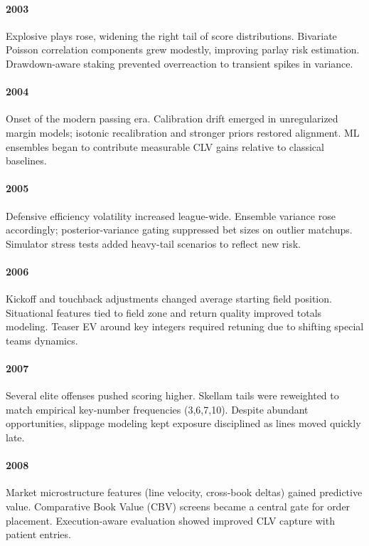 \documentclass[12pt]{report}  %
\numberwithin{equation}{section}
\theoremstyle{plain}
\theoremstyle{definition}
\theoremstyle{remark}
\begin{document}
\paragraph{2003} Explosive plays rose, widening the right tail of score distributions. Bivariate Poisson correlation components grew modestly, improving parlay risk estimation. Drawdown-aware staking prevented overreaction to transient spikes in variance.

\paragraph{2004} Onset of the modern passing era. Calibration drift emerged in unregularized margin models; isotonic recalibration and stronger priors restored alignment. ML ensembles began to contribute measurable CLV gains relative to classical baselines.

\paragraph{2005} Defensive efficiency volatility increased league-wide. Ensemble variance rose accordingly; posterior-variance gating suppressed bet sizes on outlier matchups. Simulator stress tests added heavy-tail scenarios to reflect new risk.

\paragraph{2006} Kickoff and touchback adjustments changed average starting field position. Situational features tied to field zone and return quality improved totals modeling. Teaser EV around key integers required retuning due to shifting special teams dynamics.

\paragraph{2007} Several elite offenses pushed scoring higher. Skellam tails were reweighted to match empirical key-number frequencies (3,6,7,10). Despite abundant opportunities, slippage modeling kept exposure disciplined as lines moved quickly late.

\paragraph{2008} Market microstructure features (line velocity, cross-book deltas) gained predictive value. Comparative Book Value (CBV) screens became a central gate for order placement. Execution-aware evaluation showed improved CLV capture with patient entries.
\end{document}
